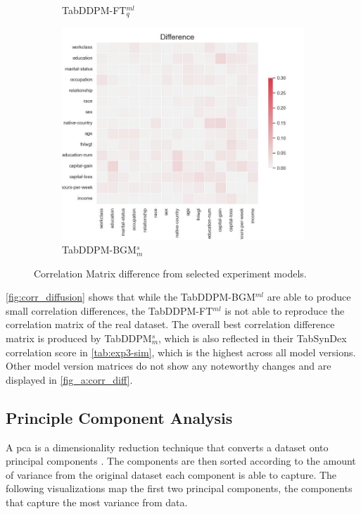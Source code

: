 \begin{figure}[h]
\begin{subfigure}{0.3\textwidth}
		\caption{TabDDPM-FT$^{ml}_q$}
	\end{subfigure}
	\hfill
	\begin{subfigure}{0.3\textwidth}
		\includegraphics[width=\textwidth]{images/correlation_difference/tab-ddpm-bgm-simTune-minmax.jpg}
		\caption{TabDDPM-BGM$^{s}_m$}
	\end{subfigure}
	\caption{Correlation Matrix difference from selected experiment models.}
	\label{fig:corr_diffusion}
\end{figure}



\autoref{fig:corr_diffusion} shows that while the TabDDPM-BGM$^{ml}$ are able to produce small correlation differences, the TabDDPM-FT$^{ml}$ is not able to reproduce
the correlation matrix of the real dataset.
The overall best correlation difference matrix is produced by TabDDPM$^{s}_m$, which is also reflected in their TabSynDex correlation score in \autoref{tab:exp3-sim}, which is the highest across all model versions.
Other model version matrices do not show any noteworthy changes and are displayed in \autoref{fig_a:corr_diff}.

\subsection{Principle Component Analysis}
\label{ch:results-pca}

A \gls{pca} is a dimensionality reduction technique that converts a dataset onto principal components \cite{brenninkmeijer2019GenerationEvaluationTabular}.
The components are then sorted according to the amount of variance from the original dataset each component is able to capture.
The following visualizations map the first two principal components, \ie the components that capture the most variance from data.


